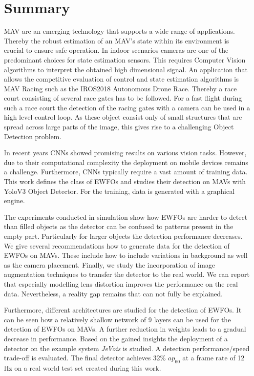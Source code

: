 \chapter*{Summary}

\ac{MAV} are an emerging technology that supports a wide range of applications. Thereby the robust estimation of an \ac{MAV}'s state within its environment is crucial to ensure safe operation. In  indoor scenarios cameras are one of the predominant choices for state estimation sensors. This requires Computer Vision algorithms to interpret the obtained high dimensional signal. An application that allows the competitive evaluation of control and state estimation algorithms is \ac{MAV} Racing such as the \ac{IROS}2018 Autonomous Drone Race. Thereby a race court consisting of several race gates has to be followed. For a fast flight during such a race court the detection of the racing gates with a camera can be used in a high level control loop. As these object consist only of small structures that are spread across large parts of the image, this gives rise to a challenging Object Detection problem.

In recent years \acp{CNN} showed promising results on various vision tasks. However, due to their computational complexity the deployment on mobile devices remains a challenge. Furthermore, \acp{CNN} typically require a vast amount of training data. This work defines the class of \acp{EWFO} and studies their detection on \acp{MAV} with \ac{Yolo}V3 Object Detector. For the training, data is generated with a graphical engine. 

The experiments conducted in simulation show how \acp{EWFO} are harder to detect than filled objects as the detector can be confused to patterns present in the empty part. Particularly for larger objects the detection performance decreases. We give several recommendations how to generate data for the detection of \acp{EWFO} on \acp{MAV}. These include how to include variations in background as well as the camera placement. Finally, we study the incorporation of image augmentation techniques to transfer the detector to the real world. We can report that especially modelling lens distortion improves the performance on the real data. Nevertheless, a reality gap remains that can not fully be explained.

Furthermore, different architectures are studied for the detection of \acp{EWFO}. It can be seen how a relatively shallow network of 9 layers can be used for the detection of \acp{EWFO} on \acp{MAV}. A further reduction in weights leads to a gradual decrease in performance. Based on the gained insights the deployment of a detector on the example system \textit{JeVois} is studied. A detection performance/speed trade-off is evaluated. The final detector achieves 32\% $ap_{60}$ at a frame rate of 12 Hz on a real world test set created during this work.


